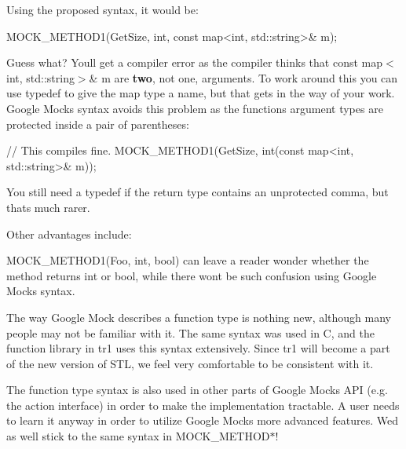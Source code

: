 Using the proposed syntax, it would be\+: 
\begin{DoxyCode}
MOCK\_METHOD1(GetSize, \textcolor{keywordtype}{int}, \textcolor{keyword}{const} map<int, std::string>& m);
\end{DoxyCode}


Guess what? You\textquotesingle{}ll get a compiler error as the compiler thinks that {\ttfamily const map$<$int, std\+::string$>$\& m} are {\bfseries two}, not one, arguments. To work around this you can use {\ttfamily typedef} to give the map type a name, but that gets in the way of your work. Google Mock\textquotesingle{}s syntax avoids this problem as the function\textquotesingle{}s argument types are protected inside a pair of parentheses\+: 
\begin{DoxyCode}
\textcolor{comment}{// This compiles fine.}
MOCK\_METHOD1(GetSize, \textcolor{keywordtype}{int}(\textcolor{keyword}{const} map<int, std::string>& m));
\end{DoxyCode}


You still need a {\ttfamily typedef} if the return type contains an unprotected comma, but that\textquotesingle{}s much rarer.

Other advantages include\+:
\begin{DoxyEnumerate}
\item {\ttfamily M\+O\+C\+K\+\_\+\+M\+E\+T\+H\+O\+D1(\+Foo, int, bool)} can leave a reader wonder whether the method returns {\ttfamily int} or {\ttfamily bool}, while there won\textquotesingle{}t be such confusion using Google Mock\textquotesingle{}s syntax.
\end{DoxyEnumerate}
\begin{DoxyEnumerate}
\item The way Google Mock describes a function type is nothing new, although many people may not be familiar with it. The same syntax was used in C, and the {\ttfamily function} library in {\ttfamily tr1} uses this syntax extensively. Since {\ttfamily tr1} will become a part of the new version of S\+TL, we feel very comfortable to be consistent with it.
\end{DoxyEnumerate}
\begin{DoxyEnumerate}
\item The function type syntax is also used in other parts of Google Mock\textquotesingle{}s A\+PI (e.\+g. the action interface) in order to make the implementation tractable. A user needs to learn it anyway in order to utilize Google Mock\textquotesingle{}s more advanced features. We\textquotesingle{}d as well stick to the same syntax in {\ttfamily M\+O\+C\+K\+\_\+\+M\+E\+T\+H\+O\+D$\ast$}!
\end{DoxyEnumerate}

